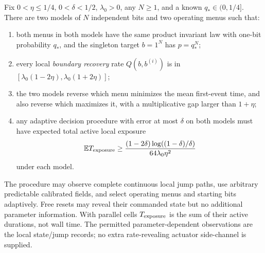 \begin{theorem}
Fix $0<\eta\le1/4$, $0<\delta<1/2$, $\lambda_0>0$, any $N\ge1$,
and a known $q_*\in(0,1/4]$.
There are two models of $N$ independent bits and two operating menus
such that:
\begin{enumerate}
\item both menus in both models have the same product invariant law
with one-bit probability $q_*$, and the singleton target $b=1^N$ has
$p=q_*^N$;
\item every local \emph{boundary recovery} rate $Q(b,b^{(i)})$ is in
$[\lambda_0(1-2\eta),\lambda_0(1+2\eta)]$;
\item the two models reverse which menu minimizes the mean first-event
time, and also reverse which maximizes it, with a multiplicative gap
larger than $1+\eta$;
\item any adaptive decision procedure with error at most $\delta$ on
both models must have expected total active local exposure
\begin{equation}
 \mathbb E T_{\rm exposure}\ge
 \frac{(1-2\delta)\log((1-\delta)/\delta)}
      {64\lambda_0\eta^2}
 \label{ra:lower}
\end{equation}
under each model.
\end{enumerate}
The procedure may observe complete continuous local jump paths, use
arbitrary predictable calibrated fields, and select operating menus and
starting bits adaptively. Free resets may reveal their commanded state
but no additional parameter information.
With parallel cells $T_{\rm exposure}$ is the sum of their active
durations, not wall time. The permitted parameter-dependent observations
are the local state/jump records; no extra rate-revealing actuator
side-channel is supplied.
\end{theorem}
